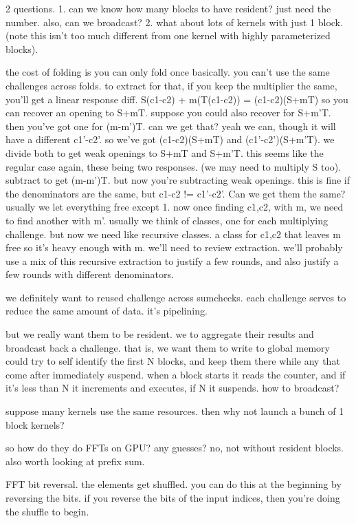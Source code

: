 2 questions.
1. can we know how many blocks to have resident? just need the number. also, can we broadcast?
2. what about lots of kernels with just 1 block. (note this isn't too much different from one kernel with highly parameterized blocks).

the cost of folding is you can only fold once basically.
you can't use the same challenges across folds. 
to extract for that, if you keep the multiplier the same, you'll get a linear response diff. 
S(c1-c2) + m(T(c1-c2)) = (c1-c2)(S+mT)
so you can recover an opening to S+mT. suppose you could also recover for S+m'T. then you've got one for (m-m')T. can we get that? yeah we can, though it will have a different c1'-c2'.
so we've got (c1-c2)(S+mT) and (c1'-c2')(S+m'T). we divide both to get weak openings to S+mT and S+m'T. this seems like the regular case again, these being two responses. (we may need to multiply S too). subtract to get (m-m')T. but now you're subtracting weak openings. this is fine if the denominators are the same, but c1-c2 != c1'-c2'. Can we get them the same?
usually we let everything free except 1. now once finding c1,c2, with m, we need to find another with m'. usually we think of classes, one for each multiplying challenge. but now we need like recursive classes. a class for c1,c2 that leaves m free so it's heavy enough with m. 
we'll need to review extraction.
we'll probably use a mix of this recursive extraction to justify a few rounds, and also justify a few rounds with different denominators. 

we definitely want to reused challenge across sumchecks. each challenge serves to reduce the same amount of data. it's pipelining. 




but we really want them to be resident. we to aggregate their results and broadcast back a challenge. that is, we want them to write to global memory
could try to self identify the first N blocks, and keep them there while any that come after immediately suspend. when a block starts it reads the counter, and if it's less than N it increments and executes, if N it suspends.
how to broadcast? 

suppose many kernels use the same resources. then why not launch a bunch of 1 block kernels?




so how do they do FFTs on GPU?
any guesses?
no, not without resident blocks. 
also worth looking at prefix sum. 


FFT bit reversal.
the elements get shuffled. you can do this at the beginning by reversing the bits. 
if you reverse the bits of the input indices, then you're doing the shuffle to begin. 

